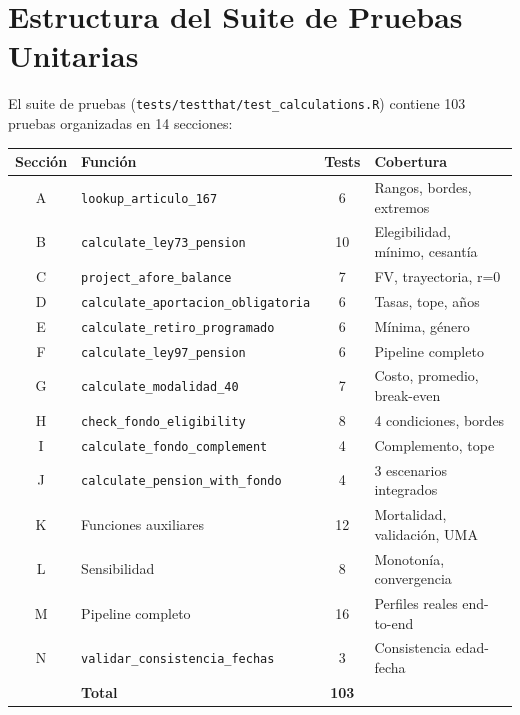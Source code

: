 \documentclass[11pt,a4paper]{report}
\theoremstyle{remark}
\begin{document}
\section{Estructura del Suite de Pruebas Unitarias}

\begin{tcolorbox}[colback=blue!5!white, colframe=blue!75!black, title=\textbf{Definici\'on Formal}]
El suite de pruebas (\texttt{tests/testthat/test\_calculations.R}) contiene 103 pruebas organizadas en 14 secciones:

\begin{center}
\small
\begin{longtable}{clcl}
\toprule
Secci\'on & Funci\'on & Tests & Cobertura \\
\midrule
\endhead
A & \texttt{lookup\_articulo\_167} & 6 & Rangos, bordes, extremos \\
B & \texttt{calculate\_ley73\_pension} & 10 & Elegibilidad, m\'inimo, cesant\'ia \\
C & \texttt{project\_afore\_balance} & 7 & FV, trayectoria, r=0 \\
D & \texttt{calculate\_aportacion\_obligatoria} & 6 & Tasas, tope, a\~nos \\
E & \texttt{calculate\_retiro\_programado} & 6 & M\'inima, g\'enero \\
F & \texttt{calculate\_ley97\_pension} & 6 & Pipeline completo \\
G & \texttt{calculate\_modalidad\_40} & 7 & Costo, promedio, break-even \\
H & \texttt{check\_fondo\_eligibility} & 8 & 4 condiciones, bordes \\
I & \texttt{calculate\_fondo\_complement} & 4 & Complemento, tope \\
J & \texttt{calculate\_pension\_with\_fondo} & 4 & 3 escenarios integrados \\
K & Funciones auxiliares & 12 & Mortalidad, validaci\'on, UMA \\
L & Sensibilidad & 8 & Monoton\'ia, convergencia \\
M & Pipeline completo & 16 & Perfiles reales end-to-end \\
N & \texttt{validar\_consistencia\_fechas} & 3 & Consistencia edad-fecha \\
\midrule
& \textbf{Total} & \textbf{103} & \\
\bottomrule
\end{longtable}
\end{center}
\end{tcolorbox}
\end{document}
